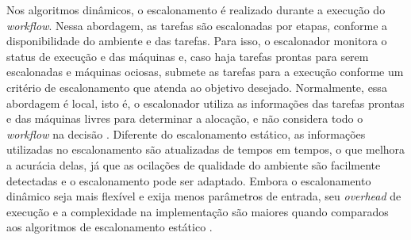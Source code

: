 Nos algoritmos dinâmicos, o escalonamento  é realizado durante a execução do \textit{workflow}. Nessa abordagem, as tarefas são escalonadas por etapas, conforme a disponibilidade do ambiente e das tarefas. Para isso, o escalonador monitora o status de execução e das máquinas e, caso haja tarefas prontas para serem escalonadas e máquinas ociosas, submete as tarefas para a execução conforme um critério de escalonamento que atenda ao objetivo desejado. Normalmente, essa abordagem é local, isto é, o escalonador utiliza as informações das tarefas prontas e das máquinas livres para determinar a alocação, e não considera todo o \textit{workflow} na decisão \cite{Fakhfakh14, Kalra15}. Diferente do escalonamento estático, as informações utilizadas no escalonamento são atualizadas de tempos em tempos, o que melhora a acurácia delas, já que as ocilações de qualidade do ambiente são facilmente detectadas e o escalonamento pode ser adaptado. Embora o escalonamento dinâmico seja mais flexível e exija menos parâmetros de entrada, seu \textit{overhead} de execução e a complexidade na implementação são maiores quando comparados aos algoritmos de escalonamento estático \cite{Fakhfakh14}.




